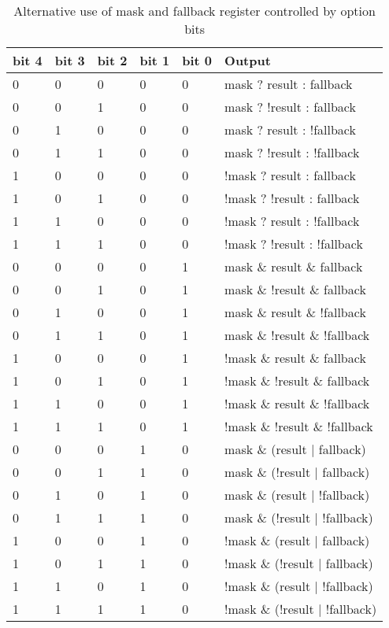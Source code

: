 \documentclass[forwardcom.tex]{subfiles}
\begin{document}
\begin{longtable} {|p{10mm}|p{10mm}|p{10mm}|p{10mm}|p{10mm}|p{60mm}|}
\caption{Alternative use of mask and fallback register controlled by option bits} 
\label{table:AlternativeMaskUseForTestBit} \\
\endfirsthead
\endhead
\hline
\bfseries bit 4 & \bfseries bit 3 & \bfseries bit 2 & \bfseries bit 1 & \bfseries bit 0 & \bfseries Output \\
\hline
0 & 0 & 0 & 0 & 0 & mask ? result : fallback \\
0 & 0 & 1 & 0 & 0 & mask ? !result : fallback \\
0 & 1 & 0 & 0 & 0 & mask ? result : !fallback \\
0 & 1 & 1 & 0 & 0 & mask ? !result : !fallback \\
1 & 0 & 0 & 0 & 0 & !mask ? result : fallback \\
1 & 0 & 1 & 0 & 0 & !mask ? !result : fallback \\
1 & 1 & 0 & 0 & 0 & !mask ? result : !fallback \\
1 & 1 & 1 & 0 & 0 & !mask ? !result : !fallback \\
\hline
0 & 0 & 0 & 0 & 1 & mask \& result \& fallback \\
0 & 0 & 1 & 0 & 1 & mask \& !result \& fallback \\
0 & 1 & 0 & 0 & 1 & mask \& result \& !fallback \\
0 & 1 & 1 & 0 & 1 & mask \& !result \& !fallback \\
1 & 0 & 0 & 0 & 1 & !mask \& result \& fallback \\
1 & 0 & 1 & 0 & 1 & !mask \& !result \& fallback \\
1 & 1 & 0 & 0 & 1 & !mask \& result \& !fallback \\
1 & 1 & 1 & 0 & 1 & !mask \& !result \& !fallback \\
\hline
0 & 0 & 0 & 1 & 0 & mask \& (result $|$ fallback) \\
0 & 0 & 1 & 1 & 0 & mask \& (!result $|$ fallback) \\
0 & 1 & 0 & 1 & 0 & mask \& (result $|$ !fallback) \\
0 & 1 & 1 & 1 & 0 & mask \& (!result $|$ !fallback) \\
1 & 0 & 0 & 1 & 0 & !mask \& (result $|$ fallback) \\
1 & 0 & 1 & 1 & 0 & !mask \& (!result $|$ fallback) \\
1 & 1 & 0 & 1 & 0 & !mask \& (result $|$ !fallback) \\
1 & 1 & 1 & 1 & 0 & !mask \& (!result $|$ !fallback) \\

\end{longtable}
\end{document}

